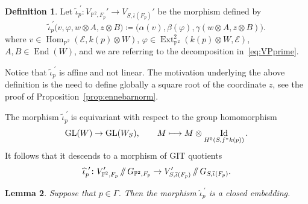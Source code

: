\documentclass[JEP,XML,SOM,Unicode,published]{cedram}
\newcommand\mto{\mathchoice{\longmapsto}{\mapsto}{\mapsto}{\mapsto}}
\providecommand\sslash{\mathop{/\mkern-5.5mu/}}
\newcommand{\PP}{{\mathbb P}}\let\P\PP
\newcommand\cE{\mathcal{E}}
\DeclareMathOperator{\End}{End}
\DeclareMathOperator{\Ext}{Ext}
\DeclareMathOperator{\GL}{GL}
\DeclareMathOperator{\Hom}{Hom}
\DeclareMathOperator{\Id}{Id}
\let\phi\varphi
\newtheorem{lemm}{Lemma}[section]
\theoremstyle{definition}
\newtheorem{defi}[lemm]{Definition}
\begin{document}
\begin{defi}
Let $\widetilde{\iota}_p^{\ \prime}\colon V_{\PP^2,F_p}'\to V_{S,\overline{\iota}(F_p)}'$ be the morphism defined by
\begin{equation}\label{eq:DefOfIotaTilde2}
\widetilde{\iota}_p^{\ \prime}
\bigl(v,\phi,w\otimes A,z\otimes B\bigr) \coloneqq \bigl(\alpha(v),\beta(\phi), \gamma(w\otimes A,z\otimes B)\bigr).
\end{equation}
where $v\in\Hom_{\PP^2}(\cE,k(p)\otimes W)$, $\phi\in\Ext^2_{\PP^2}(k(p)\otimes W,\cE)$, $A,B\in\End(W)$, and we are referring
to the decomposition in~\eqref{eq:VPprime}.
\end{defi}

Notice that $\widetilde{\iota}_p^{\ \prime}$ is affine and not linear.
The motivation underlying the above definition is the need to define globally a square root of the coordinate $z$, see the proof of Proposition~\ref{prop:ennebarnorm}.

The morphism $\widetilde{\iota}_p^{\ \prime}$ is equivariant with respect to the group homomorphism
\[
\GL(W) \to \GL(W_S), \qquad M\mto M\otimes\Id_{H^0(S,f^*k(p))}.
\]
It follows that it descends to a morphism of GIT quotients
\[
\widehat{\iota}_p^{\ \prime}\colon V_{\PP^2,F_p}'\sslash G_{\P^2,F_p} \to V_{S,\overline{\iota}(F_p)}'\sslash G_{S,\overline{\iota}(F_p)}.
\]

\begin{lemm}\label{lem:PointIsInGamma}
Suppose that $p\in\mathsf{\Gamma}$.
Then the morphism $\widehat{\iota}_p^{\ \prime}$ is a closed embedding.
\end{lemm}
\end{document}
